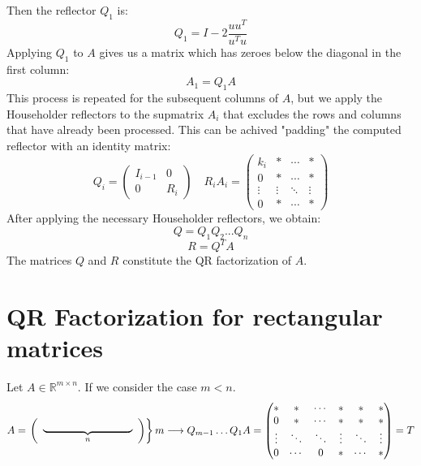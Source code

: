 Then the reflector $Q_1$ is:
\begin{equation*}
    Q_1 = I - 2\frac{uu^T}{u^Tu}
\end{equation*}
Applying $Q_1$ to $A$ gives us a matrix which has zeroes below the diagonal in the first column:
\begin{equation*}
    A_1 = Q_1A
\end{equation*}
This process is repeated for the subsequent columns of $A$,
but we apply the Householder reflectors to the supmatrix $A_i$ that
excludes the rows and columns that have already been processed.
This can be achived "padding" the computed reflector with an identity matrix:
$$ Q_i = \begin{pmatrix}
    I_{i-1} & 0 \\
    0 & R_i
\end{pmatrix} \quad  R_iA_i = \begin{pmatrix}
    k_i & * & \cdots & * \\
    0 & * & \cdots & * \\
    \vdots & \vdots & \ddots & \vdots \\
    0 & * & \cdots & *
\end{pmatrix}
$$
After applying the necessary Householder reflectors, we obtain:
\begin{equation*}
    Q = Q_1Q_2...Q_n
\end{equation*}
\begin{equation*}
    R = Q^TA
\end{equation*}
The matrices $Q$ and $R$ constitute the QR factorization of $A$.

\section{QR Factorization for rectangular matrices}
Let $A \in \mathbb{R}^{m \times n}$. If we consider the case $m < n$.
\[
A = \left.
\left( \begin{array}{c}
\underbrace{\rule{3cm}{0pt}}_{n} \\
\end{array} \right)
\right\}m
\longrightarrow Q_{m-1}\ldots Q_1A = \begin{pmatrix}
    * & * & \cdots & *  & * & * \\
    0 & * & \cdots & *  & * & * \\
    \vdots & \ddots & \ddots & \vdots & \ddots & \vdots \\
    0 & \cdots & 0 & * & \cdots & * 
\end{pmatrix} = T
\]

